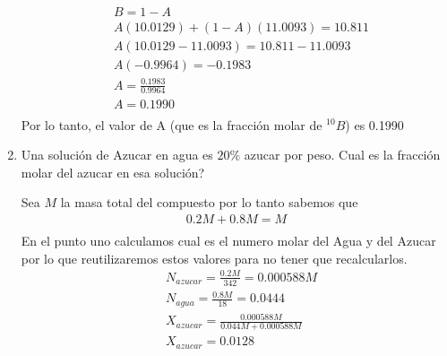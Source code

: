 \documentclass[12pt]{exam}
\begin{document}
\begin{enumerate}
\begin{align*}
			&B = 1-A\\
			&A(10.0129) + (1-A)(11.0093) = 10.811\\
			&A(10.0129-11.0093) = 10.811-11.0093\\
			&A(-0.9964) = -0.1983\\
			&A = \frac{0.1983}{0.9964}\\
			&A = 0.1990\\
		\end{align*}
		Por lo tanto, el valor de A (que es la fracción molar de $^{10}B$) es 0.1990
	\item Una solución de Azucar en agua es $20\%$ azucar por peso. Cual es la fracción molar del azucar en esa solución?

		Sea $M$ la masa total del compuesto por lo tanto sabemos que
		\begin{align*}
			0.2M + 0.8M = M\\
		\end{align*}
		En el punto uno calculamos cual es el numero molar del Agua y del Azucar por lo que reutilizaremos estos valores para no tener que recalcularlos.
		\begin{align*}
			&N_{azucar} = \frac{0.2M}{342} = 0.000588M\\
			&N_{agua} = \frac{0.8M}{18}=0.0444\\
			&X_{azucar} = \frac{0.000588M}{0.044M+0.000588M}\\
			&X_{azucar} = 0.0128
		\end{align*}
\end{enumerate}
\vspace{15cm}
\end{document}
